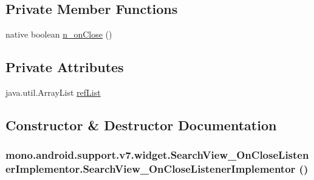 \subsection*{Private Member Functions}
\begin{CompactItemize}
\item 
native boolean \hyperlink{classmono_1_1android_1_1support_1_1v7_1_1widget_1_1_search_view___on_close_listener_implementor_ecdde4990b0d9de67568d1dcc97a97f8}{n\_\-onClose} ()
\end{CompactItemize}
\subsection*{Private Attributes}
\begin{CompactItemize}
\item 
java.util.ArrayList \hyperlink{classmono_1_1android_1_1support_1_1v7_1_1widget_1_1_search_view___on_close_listener_implementor_35e6cb831c68d443c37e7c8e9ff910d5}{refList}
\end{CompactItemize}


\subsection{Constructor \& Destructor Documentation}
\hypertarget{classmono_1_1android_1_1support_1_1v7_1_1widget_1_1_search_view___on_close_listener_implementor_82fcbbdc5f5b9e1826f5bec91c7264cb}{
\subsubsection[{SearchView\_\-OnCloseListenerImplementor}]{\setlength{\rightskip}{0pt plus 5cm}mono.android.support.v7.widget.SearchView\_\-OnCloseListenerImplementor.SearchView\_\-OnCloseListenerImplementor ()}}
\label{classmono_1_1android_1_1support_1_1v7_1_1widget_1_1_search_view___on_close_listener_implementor_82fcbbdc5f5b9e1826f5bec91c7264cb}




